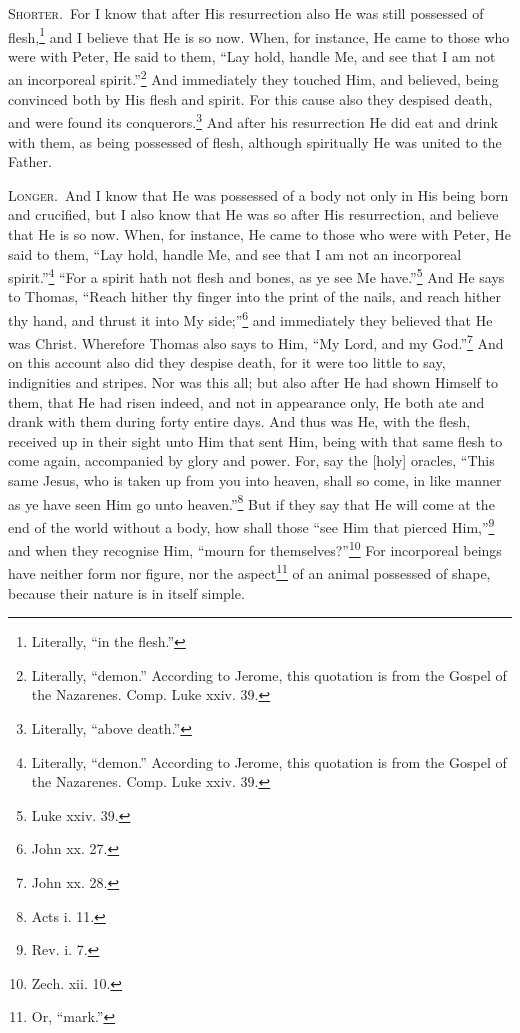 
\textsc{Shorter.}~For I know that after His resurrection also He was still possessed of flesh,\footnote{Literally, “in the flesh.”} and I believe that He is so now. When, for instance, He came to those who were with Peter, He said to them, “Lay hold, handle Me, and see that I am not an incorporeal spirit.”\footnote{Literally, “demon.” According to Jerome, this quotation is from the Gospel of the Nazarenes. Comp. Luke xxiv. 39.} And immediately they touched Him, and believed, being convinced both by His flesh and spirit. For this cause also they despised death, and were found its conquerors.\footnote{Literally, “above death.”} And after his resurrection He did eat and drink with them, as being possessed of flesh, although spiritually He was united to the Father.

\textsc{Longer.}~And I know that He was possessed of a body not only in His being born and crucified, but I also know that He was so after His resurrection, and believe that He is so now. When, for instance, He came to those who were with Peter, He said to them, “Lay hold, handle Me, and see that I am not an incorporeal spirit.”\footnote{Literally, “demon.” According to Jerome, this quotation is from the Gospel of the Nazarenes. Comp. Luke xxiv. 39.} “For a spirit hath not flesh and bones, as ye see Me have.”\footnote{Luke xxiv. 39.} And He says to Thomas, “Reach hither thy finger into the print of the nails, and reach hither thy hand, and thrust it into My side;”\footnote{John xx. 27.} and immediately they believed that He was Christ. Wherefore Thomas also says to Him, “My Lord, and my God.”\footnote{John xx. 28.} And on this account also did they despise death, for it were too little to say, indignities and stripes. Nor was this all; but also after He had shown Himself to them, that He had risen indeed, and not in appearance only, He both ate and drank with them during forty entire days. And thus was He, with the flesh, received up in their sight unto Him that sent Him, being with that same flesh to come again, accompanied by glory and power. For, say the [holy] oracles, “This same Jesus, who is taken up from you into heaven, shall so come, in like manner as ye have seen Him go unto heaven.”\footnote{Acts i. 11.} But if they say that He will come at the end of the world without a body, how shall those “see Him that pierced Him,”\footnote{Rev. i. 7.} and when they recognise Him, “mourn for themselves?”\footnote{Zech. xii. 10.} For incorporeal beings have neither form nor figure, nor the aspect\footnote{Or, “mark.”} of an animal possessed of shape, because their nature is in itself simple.


